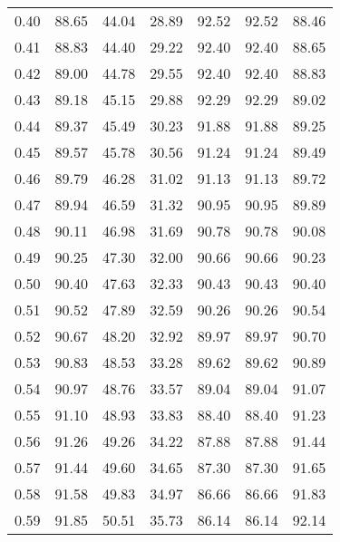 \begin{tabular}{|c|c|c|c|c|c|c|}
      0.40 &     88.65 &     44.04 &      28.89 &   92.52 &      92.52 &         88.46 \\
      0.41 &     88.83 &     44.40 &      29.22 &   92.40 &      92.40 &         88.65 \\
      0.42 &     89.00 &     44.78 &      29.55 &   92.40 &      92.40 &         88.83 \\
      0.43 &     89.18 &     45.15 &      29.88 &   92.29 &      92.29 &         89.02 \\
      0.44 &     89.37 &     45.49 &      30.23 &   91.88 &      91.88 &         89.25 \\
      0.45 &     89.57 &     45.78 &      30.56 &   91.24 &      91.24 &         89.49 \\
      0.46 &     89.79 &     46.28 &      31.02 &   91.13 &      91.13 &         89.72 \\
      0.47 &     89.94 &     46.59 &      31.32 &   90.95 &      90.95 &         89.89 \\
      0.48 &     90.11 &     46.98 &      31.69 &   90.78 &      90.78 &         90.08 \\
      0.49 &     90.25 &     47.30 &      32.00 &   90.66 &      90.66 &         90.23 \\
      0.50 &     90.40 &     47.63 &      32.33 &   90.43 &      90.43 &         90.40 \\
      0.51 &     90.52 &     47.89 &      32.59 &   90.26 &      90.26 &         90.54 \\
      0.52 &     90.67 &     48.20 &      32.92 &   89.97 &      89.97 &         90.70 \\
      0.53 &     90.83 &     48.53 &      33.28 &   89.62 &      89.62 &         90.89 \\
      0.54 &     90.97 &     48.76 &      33.57 &   89.04 &      89.04 &         91.07 \\
      0.55 &     91.10 &     48.93 &      33.83 &   88.40 &      88.40 &         91.23 \\
      0.56 &     91.26 &     49.26 &      34.22 &   87.88 &      87.88 &         91.44 \\
      0.57 &     91.44 &     49.60 &      34.65 &   87.30 &      87.30 &         91.65 \\
      0.58 &     91.58 &     49.83 &      34.97 &   86.66 &      86.66 &         91.83 \\
      0.59 &     91.85 &     50.51 &      35.73 &   86.14 &      86.14 &         92.14 \\

\end{tabular}
